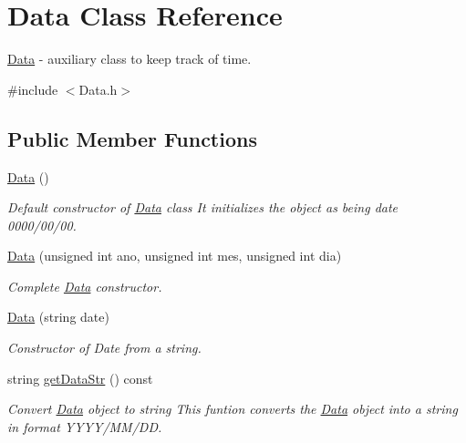 \hypertarget{class_data}{\section{Data Class Reference}
\label{class_data}
}


\hyperlink{class_data}{Data} -\/ auxiliary class to keep track of time.  




{\ttfamily \#include $<$Data.\+h$>$}

\subsection*{Public Member Functions}
\begin{DoxyCompactItemize}
\item 
\hypertarget{class_data_af11f741cb7f587e2e495452a8905a22a}{\hyperlink{class_data_af11f741cb7f587e2e495452a8905a22a}{Data} ()}\label{class_data_af11f741cb7f587e2e495452a8905a22a}

\begin{DoxyCompactList}\small\item\em Default constructor of \hyperlink{class_data}{Data} class It initializes the object as being date 0000/00/00. \end{DoxyCompactList}\item 
\hyperlink{class_data_a2d45e272eb3ff0783c1603ddf7a44569}{Data} (unsigned int ano, unsigned int mes, unsigned int dia)
\begin{DoxyCompactList}\small\item\em Complete \hyperlink{class_data}{Data} constructor. \end{DoxyCompactList}\item 
\hyperlink{class_data_add8227267c76e3fecb385d7cd7fbcf4b}{Data} (string date)
\begin{DoxyCompactList}\small\item\em Constructor of Date from a string. \end{DoxyCompactList}\item 
string \hyperlink{class_data_a2a9f0b2202a6bf68215d3e06dc3cb57e}{get\+Data\+Str} () const 
\begin{DoxyCompactList}\small\item\em Convert \hyperlink{class_data}{Data} object to string This funtion converts the \hyperlink{class_data}{Data} object into a string in format Y\+Y\+Y\+Y/\+M\+M/\+D\+D. \end{DoxyCompactList}\end{DoxyCompactItemize}
